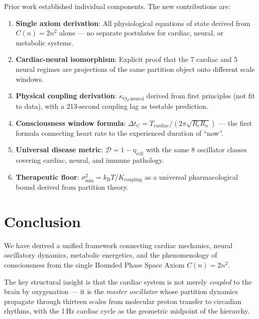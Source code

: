 \documentclass[10pt,twocolumn,a4paper]{article}
\theoremstyle{definition}
\newcommand{\kBT}{k_{\text{B}}T}
\begin{document}
Prior work established individual components. The new contributions are:

\begin{enumerate}
\item \textbf{Single axiom derivation}: All physiological equations of state
  derived from $C(n) = 2n^2$ alone — no separate postulates for cardiac,
  neural, or metabolic systems.

\item \textbf{Cardiac-neural isomorphism}: Explicit proof that the 7 cardiac
  and 5 neural regimes are projections of the same partition object onto
  different scale windows.

\item \textbf{Physical coupling derivation}: $\kappa_{\text{O}_2\text{-neural}}$
  derived from first principles (not fit to data), with a 213-second coupling
  lag as testable prediction.

\item \textbf{Consciousness window formula}: $\Delta t_C = T_{\text{cardiac}}/(2\pi\sqrt{R_c R_n})$
  — the first formula connecting heart rate to the experienced duration of ``now''.

\item \textbf{Universal disease metric}: $\mathcal{D} = 1 - \eta_{\text{cell}}$
  with the same 8 oscillator classes covering cardiac, neural, and immune pathology.

\item \textbf{Therapeutic floor}: $\sigma^2_{\min} = \kBT/K_{\text{coupling}}$
  as a universal pharmacological bound derived from partition theory.
\end{enumerate}

\section{Conclusion}
\label{sec:conclusion}

We have derived a unified framework connecting cardiac mechanics,
neural oscillatory dynamics, metabolic energetics, and the phenomenology
of consciousness from the single Bounded Phase Space Axiom $C(n) = 2n^2$.

The key structural insight is that the cardiac system is not merely
\emph{coupled} to the brain by oxygenation — it is the \emph{master oscillator}
whose partition dynamics propagate through thirteen scales from molecular
proton transfer to circadian rhythms, with the 1\,Hz cardiac cycle as the
geometric midpoint of the hierarchy.
\end{document}
